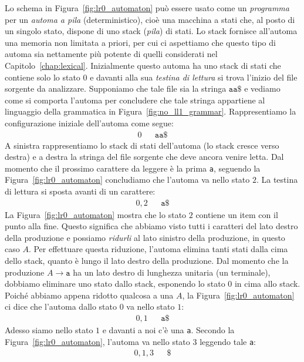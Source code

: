 Lo schema in Figura~\ref{fig:lr0_automaton} pu\`o essere usato come
un \emph{programma} per un \emph{automa a pila} (deterministico),
cio\`e una macchina a stati che, al posto di un singolo stato,
dispone di uno stack (\emph{pila}) di stati.
Lo stack fornisce all'automa una memoria non limitata a priori, per cui
ci aspettiamo che questo tipo di automa sia nettamente pi\`u potente di
quelli considerati nel Capitolo~\ref{chap:lexical}. Inizialmente questo
automa ha uno stack di stati che contiene solo lo stato $0$ e davanti
alla sua \emph{testina di lettura} si trova l'inizio del file sorgente da
analizzare. Supponiamo che tale file sia la stringa $\mathtt{aa\$}$ e vediamo
come si comporta l'automa per concludere che tale stringa appartiene al
linguaggio della grammatica in Figura~\ref{fig:no_ll1_grammar}.
Rappresentiamo la configurazione iniziale dell'automa come segue:
\begin{align*}
  0 & & \mathtt{aa\$}
\end{align*}
A sinistra rappresentiamo lo stack di stati dell'automa (lo stack cresce verso
destra) e a destra la stringa del file sorgente che deve ancora venire letta.
Dal momento che il prossimo carattere da leggere \`e la prima \texttt{a},
seguendo la Figura~\ref{fig:lr0_automaton} concludiamo che l'automa
va nello stato $2$. La testina di lettura si sposta avanti di un carattere:
\begin{align*}
  0,2 & & \mathtt{a\$}
\end{align*}
La Figura~\ref{fig:lr0_automaton} mostra che lo stato $2$ contiene un item
con il punto alla fine. Questo significa che abbiamo visto tutti i caratteri
del lato destro della produzione e possiamo \emph{ridurli} al lato sinistro
della produzione, in questo caso $A$. Per effettuare questa riduzione, l'automa
elimina tanti stati dalla cima dello stack, quanto \`e lungo il lato destro
della produzione. Dal momento che la produzione $A\to\mathtt{a}$ ha un
lato destro di lunghezza unitaria (un terminale), dobbiamo eliminare uno
stato dallo stack, esponendo lo stato $0$ in cima allo stack.
Poich\'e abbiamo appena ridotto qualcosa
a una $A$, la Figura~\ref{fig:lr0_automaton}
ci dice che l'automa dallo stato $0$ va nello stato $1$:
\begin{align*}
  0,1 & & \mathtt{a\$}
\end{align*}
Adesso siamo nello stato $1$ e davanti a noi c'\`e una \texttt{a}.
Secondo la Figura~\ref{fig:lr0_automaton}, l'automa va nello stato
$3$ leggendo tale \texttt{a}:
\begin{align*}
  0,1,3 & & \mathtt{\$}
\end{align*}
